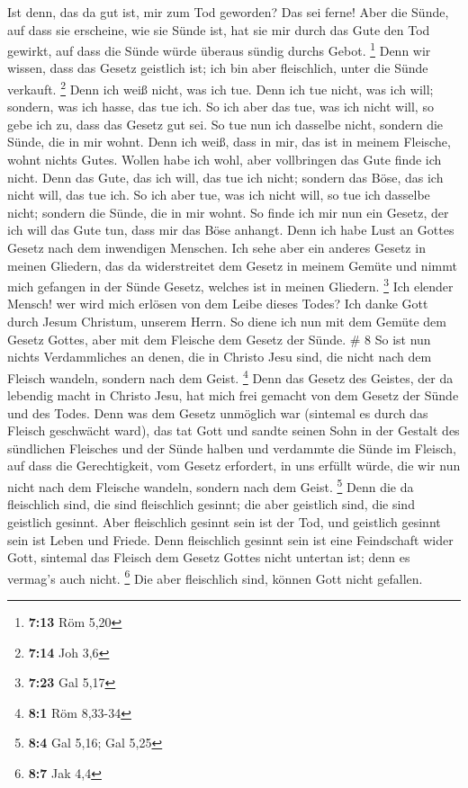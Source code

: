  Ist denn, das da gut ist, mir zum Tod geworden? Das sei
ferne! Aber die Sünde, auf dass sie erscheine, wie sie Sünde ist, hat
sie mir durch das Gute den Tod gewirkt, auf dass die Sünde würde überaus
sündig durchs Gebot. \footnote{\textbf{7:13} Röm 5,20} 
Denn wir wissen, dass das Gesetz geistlich ist; ich bin aber
fleischlich, unter die Sünde verkauft. \footnote{\textbf{7:14} Joh 3,6}
 Denn ich weiß nicht, was ich tue. Denn ich tue nicht,
was ich will; sondern, was ich hasse, das tue ich.  So
ich aber das tue, was ich nicht will, so gebe ich zu, dass das Gesetz
gut sei.  So tue nun ich dasselbe nicht, sondern die
Sünde, die in mir wohnt.  Denn ich weiß, dass in mir, das
ist in meinem Fleische, wohnt nichts Gutes. Wollen habe ich wohl, aber
vollbringen das Gute finde ich nicht.  Denn das Gute, das
ich will, das tue ich nicht; sondern das Böse, das ich nicht will, das
tue ich.  So ich aber tue, was ich nicht will, so tue ich
dasselbe nicht; sondern die Sünde, die in mir wohnt.  So
finde ich mir nun ein Gesetz, der ich will das Gute tun, dass mir das
Böse anhangt.  Denn ich habe Lust an Gottes Gesetz nach
dem inwendigen Menschen.  Ich sehe aber ein anderes
Gesetz in meinen Gliedern, das da widerstreitet dem Gesetz in meinem
Gemüte und nimmt mich gefangen in der Sünde Gesetz, welches ist in
meinen Gliedern. \footnote{\textbf{7:23} Gal 5,17}  Ich
elender Mensch! wer wird mich erlösen von dem Leibe dieses Todes?
 Ich danke Gott durch Jesum Christum, unserem Herrn. So
diene ich nun mit dem Gemüte dem Gesetz Gottes, aber mit dem Fleische
dem Gesetz der Sünde. \# 8  So ist nun nichts
Verdammliches an denen, die in Christo Jesu sind, die nicht nach dem
Fleisch wandeln, sondern nach dem Geist. \footnote{\textbf{8:1} Röm
  8,33-34}  Denn das Gesetz des Geistes, der da lebendig
macht in Christo Jesu, hat mich frei gemacht von dem Gesetz der Sünde
und des Todes.  Denn was dem Gesetz unmöglich war
(sintemal es durch das Fleisch geschwächt ward), das tat Gott und sandte
seinen Sohn in der Gestalt des sündlichen Fleisches und der Sünde halben
und verdammte die Sünde im Fleisch,  auf dass die
Gerechtigkeit, vom Gesetz erfordert, in uns erfüllt würde, die wir nun
nicht nach dem Fleische wandeln, sondern nach dem Geist. \footnote{\textbf{8:4}
  Gal 5,16; Gal 5,25}  Denn die da fleischlich sind, die
sind fleischlich gesinnt; die aber geistlich sind, die sind geistlich
gesinnt.  Aber fleischlich gesinnt sein ist der Tod, und
geistlich gesinnt sein ist Leben und Friede.  Denn
fleischlich gesinnt sein ist eine Feindschaft wider Gott, sintemal das
Fleisch dem Gesetz Gottes nicht untertan ist; denn es vermag's auch
nicht. \footnote{\textbf{8:7} Jak 4,4}  Die aber
fleischlich sind, können Gott nicht gefallen.

